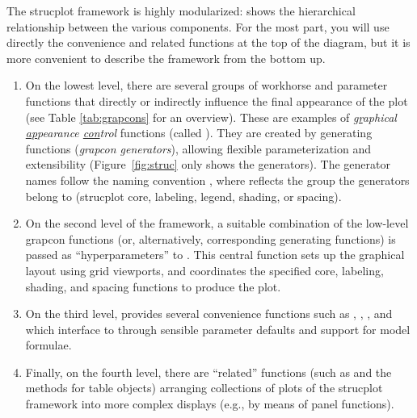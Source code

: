 \documentclass[11pt]{book}\usepackage[]{graphicx}\usepackage[]{color}
\begin{document}
The strucplot framework is highly modularized: 
shows the hierarchical relationship between the various components.
For the most part, you will use directly the convenience and related
functions at the top of the diagram, but it is more convenient to 
describe the framework from the bottom up.


\begin{enumerate}

\item On the lowest level, there are several groups of workhorse and
parameter functions that directly or indirectly influence the final
appearance of the plot (see Table \ref{tab:grapcons} for an overview).
These are examples of 
\emph{\underline{gr}aphical \underline{ap}pearance \underline{con}trol} functions
(called ). 
They are created by generating functions
(\emph{grapcon generators}), allowing
flexible parameterization and extensibility (Figure~\ref{fig:struc}
only shows the generators). The generator names
follow the naming convention ,
where  reflects the group the
generators belong to (strucplot core, labeling,
legend, shading, or spacing). 

\item On the second level of the framework, a suitable combination
of the low-level grapcon functions (or, alternatively, corresponding generating functions)
is passed as ``hyperparameters'' to .
This central function
sets up the graphical layout using grid viewports,
and coordinates the specified core, labeling, shading, and spacing functions to produce
the plot. 

\item On the third level,  provides
several convenience functions such as ,
, , and  which
interface to  through sensible parameter defaults
and support for model formulae. 

\item Finally, on the fourth
level, there are ``related''  functions (such as 
and the  methods for table objects)
arranging collections of plots of the strucplot
framework into more complex displays (e.g., by means of panel functions).
\end{enumerate}
\end{document}
